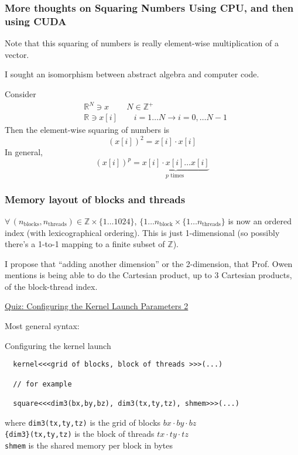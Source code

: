 \documentclass[10pt]{amsart}
\begin{document}
\begin{multicols*}{2}
\subsubsection{More thoughts on Squaring Numbers Using CPU, and then using CUDA}

Note that this squaring of numbers is really element-wise multiplication of a vector.

I sought an isomorphism between abstract algebra and computer code.

Consider
\[
\begin{aligned}
 &  \mathbb{R}^N \ni x \qquad \, N \in \mathbb{Z}^+ \\ 
 &  \mathbb{R} \ni x[i] \qquad i = 1 \dots N \to i = 0, \dots N-1 
  \end{aligned}
\]
Then the element-wise squaring of numbers is
\[
(x[i])^2 = x[i] \cdot x[i]
\]
In general,
\[
(x[i])^p = \underbrace{x[i]\cdot x[i] \dots x[i]}_{ p \text{ times } }
\]

\subsubsection{Memory layout of blocks and threads}

$\forall \, (n_{\text{blocks}}, n_{\text{threads}}) \in \mathbb{Z} \times \lbrace 1 \dots 1024 \rbrace$, $\lbrace 1 \dots n_{\text{block}} \times \lbrace 1 \dots n_{\text{threads}} \rbrace$ is now an ordered index (with lexicographical ordering).  This is just 1-dimensional (so possibly there's a 1-to-1 mapping to a finite subset of $\mathbb{Z}$).

I propose that ``adding another dimension'' or the 2-dimension, that Prof. Owen mentions is being able to do the Cartesian product, up to 3 Cartesian products, of the block-thread index.  

\href{https://classroom.udacity.com/courses/cs344/lessons/55120467/concepts/668398860923}{Quiz: Configuring the Kernel Launch Parameters 2 }

Most general syntax:

Configuring the kernel launch
\begin{lstlisting}
  kernel<<<grid of blocks, block of threads >>>(...)

  // for example

  square<<<dim3(bx,by,bz), dim3(tx,ty,tz), shmem>>>(...)
  \end{lstlisting}
where \verb|dim3(tx,ty,tz)| is the grid of blocks $bx\cdot by \cdot bz$ \\
\phantom{ where } \verb|{dim3}(tx,ty,tz)| is the block of threads $tx \cdot ty \cdot tz$ \\
\phantom{ where } \verb|shmem| is the shared memory per block in bytes



\end{multicols*}
\end{document}
